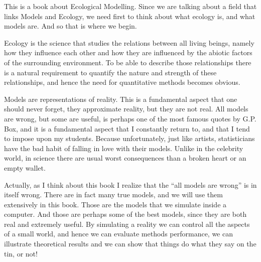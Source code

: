 \documentclass[
]{book}
\begin{document}
This is a book about Ecological Modelling. Since we are talking about a field that links Models and Ecology, we need first to think about what ecology is, and what models are. And so that is where we begin.

Ecology is the science that studies the relations between all living beings, namely how they influence each other and how they are influenced by the abiotic factors of the surrounding environment. To be able to describe those relationships there is a natural requirement to quantify the nature and strength of these relationships, and hence the need for quantitative methods becomes obvious.

Models are representations of reality. This is a fundamental aspect that one should never forget, they approximate reality, but they are not real. All models are wrong, but some are useful, is perhaps one of the most famous quotes by G.P. Box, and it is a fundamental aspect that I constantly return to, and that I tend to impose upon my students. Because unfortunately, just like artists, statisticians have the bad habit of falling in love with their models. Unlike in the celebrity world, in science there are usual worst consequences than a broken heart or an empty wallet.

Actually, as I think about this book I realize that the ``all models are wrong'' is in itself wrong. There are in fact many true models, and we will use them extensively in this book. Those are the models that we simulate inside a computer. And those are perhaps some of the best models, since they are both real and extremely useful. By simulating a reality we can control all the aspects of a small world, and hence we can evaluate methods performance, we can illustrate theoretical results and we can show that things do what they say on the tin, or not!
\end{document}
